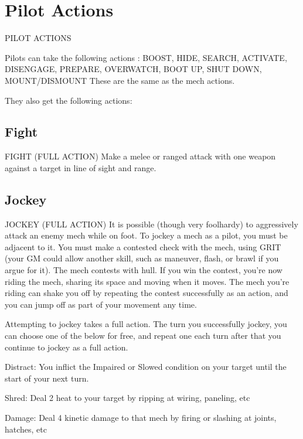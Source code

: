 \section{Pilot Actions}
   PILOT ACTIONS  

Pilots can take the following actions : BOOST, HIDE, SEARCH, ACTIVATE, DISENGAGE,   
PREPARE, OVERWATCH, BOOT UP, SHUT DOWN, MOUNT/DISMOUNT  
These are the same as the mech actions.
 

They also get the following actions:
 
\subsection{Fight}
                                      FIGHT (FULL ACTION)  
Make a melee or ranged attack with one weapon against a target in line of sight and range.
 
\subsection{Jockey}

                                    JOCKEY (FULL ACTION)  
It is possible (though very foolhardy) to aggressively attack an enemy mech while on foot. To  
jockey a mech as a pilot, you must be adjacent to it. You must make a contested check with the  
mech, using GRIT (your GM could allow another skill, such as maneuver, flash, or brawl if you  
argue for it). The mech contests with hull. If you win the contest, you’re now riding the mech,  
sharing its space and moving when it moves. The mech you’re riding can shake you off by  
repeating the contest successfully as an action, and you can jump off as part of your movement  
any time. 
 

Attempting to jockey takes a full action. The turn you successfully jockey, you can choose one of  
the below for free, and repeat one each turn after that you continue to jockey as a full action.
 

Distract: You inflict the Impaired or Slowed condition on your target until the start of your next  
turn.
 
Shred: Deal 2 heat to your target by ripping at wiring, paneling, etc
 
Damage: Deal 4 kinetic damage to that mech by firing or slashing at joints, hatches, etc
 

                                                                                                           

